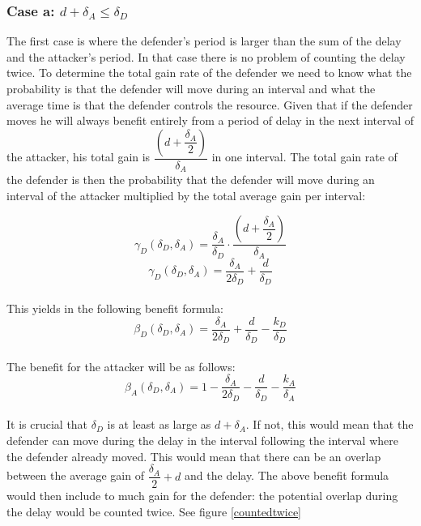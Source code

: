 \subsubsection*{\textbf{Case a:} $d + \delta_{A} \leq \delta_{D}$}
The first case is where the defender's period is larger than the sum of the delay and the attacker's period. In that case there is no problem of counting the delay twice. To determine the total gain rate of the defender we need to know what the probability is that the defender will move during an interval and what the average time is that the defender controls the resource. Given that if the defender moves he will always benefit entirely from a period of delay in the next interval of the attacker, his total gain is $\dfrac{(d+\dfrac{\delta_{A}}{2})}{\delta_{A}}$ in one interval. The total gain  rate of the defender is then the probability that the defender will move during an interval of the attacker multiplied by the total average gain per interval: 

\begin{equation*}\label{first}
\gamma_{D}(\delta_{D},\delta_{A}) = \dfrac{\delta_{A}}{\delta_{D}} \cdot \dfrac{(d+\dfrac{\delta_{A}}{2})}{\delta_{A}} 
\end{equation*}
\begin{equation*}\label{first}
\gamma_{D}(\delta_{D},\delta_{A}) = \dfrac{\delta_{A}}{2\delta_{D}} + \dfrac{d}{\delta_{D}} 
\end{equation*}\\
This yields in the following benefit formula:
\begin{equation*}\label{first}
\beta_{D}(\delta_{D},\delta_{A}) = \dfrac{\delta_{A}}{2\delta_{D}} + \dfrac{d}{\delta_{D}} - \dfrac{k_{D}}{ \delta_{D}}
\end{equation*}\\

The benefit for the attacker will be as follows:
\begin{equation*}\label{first}
\beta_{A}(\delta_{D},\delta_{A}) = 1 -\dfrac{\delta_{A}}{2\delta_{D}} - \dfrac{d}{\delta_{D}} - \dfrac{k_{A}}{ \delta_{A}}
\end{equation*}\\



It is crucial that $ \delta_{D}$ is at least as large as $d + \delta_{A}$. If not, this would mean that the defender can move during the delay in the interval following the interval where the defender already moved. This would mean that there can be an overlap between the average gain of $\dfrac{\delta_{A}}{2} +d$ and the delay. The above benefit formula would then include to much gain for the defender: the potential overlap during the delay would be counted twice. See figure \ref{countedtwice}\\

